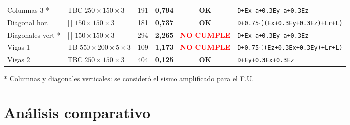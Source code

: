 ﻿\documentclass[11.5pt,aspectratio=169,handout]{beamer}
\begin{document}
\begin{frame}
\begin{center}
{{\begin{tabular}{@{}lllrcl@{}}
  Columnas 3 \alert{*} & TBC $250\times150\times3$        & 191 & \textbf{0,794} & \textcolor{verdeBox}{\textbf{OK}}   & \texttt{\tiny D+Ex-a+0.3Ey-a+0.3Ez} \\
  Diagonal hor.  & {[}\,{]} $150\times150\times3$    & 181 & \textbf{0,737} & \textcolor{verdeBox}{\textbf{OK}}   & \texttt{\tiny D+0.75$\cdot$((Ex+0.3Ey+0.3Ez)+Lr+L)} \\
  Diagonales vert \alert{*} & {[}\,{]} $150\times150\times3$ & 294 & \textbf{2,265} & \textcolor{red}{\textbf{NO CUMPLE}} & \texttt{\tiny D+Ex-a+0.3Ey-a+0.3Ez} \\
  Vigas 1        & TB $550\times200\times5\times3$   & 109 & \textbf{1,173} & \textcolor{red}{\textbf{NO CUMPLE}} & \texttt{\tiny D+0.75$\cdot$((Ez+0.3Ex+0.3Ey)+Lr+L)} \\
  Vigas 2        & TBC $250\times150\times3$          & 404 & \textbf{0,125} & \textcolor{verdeBox}{\textbf{OK}}   & \texttt{\tiny D+Ey+0.3Ex+0.3Ez} \\
  \bottomrule
\end{tabular}}
}\end{center}
\vspace{1mm}
{\footnotesize \alert{*} Columnas y diagonales verticales: se consideró el sismo amplificado para el F.U.}
\end{frame}


\section{Análisis comparativo}
\end{document}
